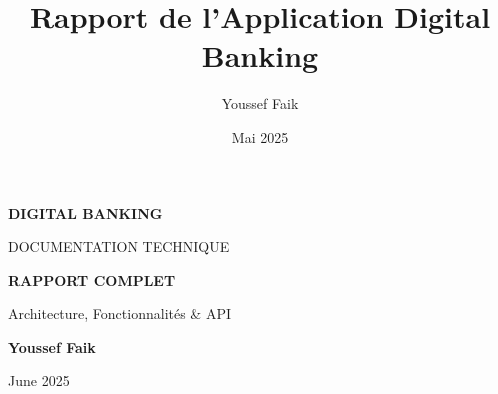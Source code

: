\documentclass[10pt]{article}
\title{\Huge\textbf{\textcolor{primary}{Rapport de l'Application Digital Banking}}}
\author{\large\textcolor{darktext}{Youssef Faik}}
\date{\large\textcolor{darktext}{Mai 2025}}
\begin{document}
\begin{titlepage}
    \thispagestyle{empty}
    
    \begin{center}
        \vspace*{-1cm}
        
        \vspace{1cm}
        {\fontsize{30}{36}\selectfont\sffamily\bfseries\textcolor{primary}{DIGITAL BANKING}\par}
        \vspace{0.3cm}
        {\large\sffamily\textcolor{lighttext}{DOCUMENTATION TECHNIQUE}\par}
        
        \vspace{2cm}
    \end{center}
    
    \begin{center}
        \begin{tcolorbox}[
            enhanced,
            width=0.85\textwidth,
            colback=background,
            colframe=primary,
            arc=10pt,
            boxrule=1pt,
            boxsep=15pt,
            left=20pt,
            right=20pt
        ]
            \begin{center}
                \vspace{0.5cm}
                {\LARGE\sffamily\bfseries\textcolor{primary}{RAPPORT COMPLET}\par}
                \vspace{0.3cm}
                {\large\sffamily\textcolor{darktext}{Architecture, Fonctionnalités \& API}\par}
                \vspace{1cm}
            \end{center}
        \end{tcolorbox}
    \end{center}
    
    \vfill
    
    \begin{center}
        \begin{tcolorbox}[
            enhanced,
            width=0.9\textwidth,
            colback=white,
            colframe=bordercolor,
            arc=5pt,
            boxrule=0.5pt,
            boxsep=10pt
        ]
            \begin{center}
                {\large\sffamily\bfseries\textcolor{primary}{Youssef Faik}\par}
                \vspace{0.2cm}
                {\small\sffamily\textcolor{lighttext}{June 2025}\par}
                \vspace{0.3cm}
                

\end{center}
\end{tcolorbox}
\end{center}
\end{titlepage}
\end{document}
